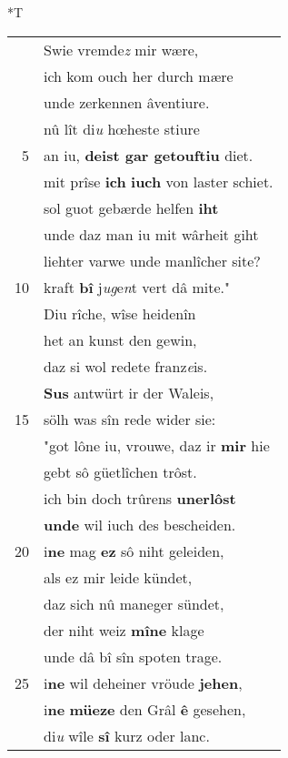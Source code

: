 \documentclass[8pt,a4paper,notitlepage]{article}
\begin{document}
\begin{table}[ht]
\begin{minipage}[t]{0.5\linewidth}
\end{minipage}
\hspace{0.5cm}
\begin{minipage}[t]{0.5\linewidth}
\small
\begin{center}*T
\end{center}
\begin{tabular}{rl}
 & Swie vremde\textit{z} mir wære,\\ 
 & ich kom ouch her durch mære\\ 
 & unde zerkennen âventiure.\\ 
 & nû lît di\textit{u} hœheste stiure\\ 
5 & an iu, \textbf{deist gar getouftiu} diet.\\ 
 & mit prîse \textbf{ich} \textbf{iuch} von laster schiet.\\ 
 & sol guot gebærde helfen \textbf{iht}\\ 
 & unde daz man iu mit wârheit giht\\ 
 & liehter varwe unde manlîcher site?\\ 
10 & kraft \textbf{bî} j\textit{ug}e\textit{n}t vert dâ mite."\\ 
 & Diu rîche, wîse heidenîn\\ 
 & het an kunst den gewin,\\ 
 & daz si wol redete franz\textit{e}is.\\ 
 & \textbf{Sus} antwürt ir der Waleis,\\ 
15 & sölh was sîn rede wider sie:\\ 
 & "got lône iu, vrouwe, daz ir \textbf{mir} hie\\ 
 & gebt sô güetlîchen trôst.\\ 
 & ich bin doch trûrens \textbf{unerlôst}\\ 
 & \textbf{unde} wil iuch des bescheiden.\\ 
20 & i\textbf{ne} mag \textbf{ez} sô niht geleiden,\\ 
 & als ez mir leide kündet,\\ 
 & daz sich nû maneger sündet,\\ 
 & der niht weiz \textbf{mîne} klage\\ 
 & unde dâ bî sîn spoten trage.\\ 
25 & i\textbf{ne} wil deheiner vröude \textbf{jehen},\\ 
 & i\textbf{ne} \textbf{müeze} den Grâl \textbf{ê} gesehen,\\ 
 & di\textit{u} wîle \textbf{sî} kurz oder lanc.\\ 

\end{tabular}
\end{minipage}
\end{table}
\end{document}
